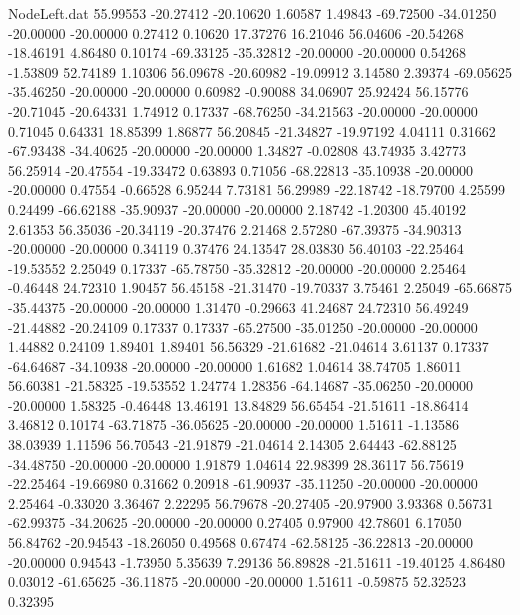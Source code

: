 \begin{filecontents}{NodeLeft.dat}
  55.99553  -20.27412  -20.10620     1.60587    1.49843  -69.72500  -34.01250  -20.00000  -20.00000    0.27412    0.10620   17.37276   16.21046
  56.04606  -20.54268  -18.46191     4.86480    0.10174  -69.33125  -35.32812  -20.00000  -20.00000    0.54268   -1.53809   52.74189    1.10306
  56.09678  -20.60982  -19.09912     3.14580    2.39374  -69.05625  -35.46250  -20.00000  -20.00000    0.60982   -0.90088   34.06907   25.92424
  56.15776  -20.71045  -20.64331     1.74912    0.17337  -68.76250  -34.21563  -20.00000  -20.00000    0.71045    0.64331   18.85399    1.86877
  56.20845  -21.34827  -19.97192     4.04111    0.31662  -67.93438  -34.40625  -20.00000  -20.00000    1.34827   -0.02808   43.74935    3.42773
  56.25914  -20.47554  -19.33472     0.63893    0.71056  -68.22813  -35.10938  -20.00000  -20.00000    0.47554   -0.66528    6.95244    7.73181
  56.29989  -22.18742  -18.79700     4.25599    0.24499  -66.62188  -35.90937  -20.00000  -20.00000    2.18742   -1.20300   45.40192    2.61353
  56.35036  -20.34119  -20.37476     2.21468    2.57280  -67.39375  -34.90313  -20.00000  -20.00000    0.34119    0.37476   24.13547   28.03830
  56.40103  -22.25464  -19.53552     2.25049    0.17337  -65.78750  -35.32812  -20.00000  -20.00000    2.25464   -0.46448   24.72310    1.90457
  56.45158  -21.31470  -19.70337     3.75461    2.25049  -65.66875  -35.44375  -20.00000  -20.00000    1.31470   -0.29663   41.24687   24.72310
  56.49249  -21.44882  -20.24109     0.17337    0.17337  -65.27500  -35.01250  -20.00000  -20.00000    1.44882    0.24109    1.89401    1.89401
  56.56329  -21.61682  -21.04614     3.61137    0.17337  -64.64687  -34.10938  -20.00000  -20.00000    1.61682    1.04614   38.74705    1.86011
  56.60381  -21.58325  -19.53552     1.24774    1.28356  -64.14687  -35.06250  -20.00000  -20.00000    1.58325   -0.46448   13.46191   13.84829
  56.65454  -21.51611  -18.86414     3.46812    0.10174  -63.71875  -36.05625  -20.00000  -20.00000    1.51611   -1.13586   38.03939    1.11596
  56.70543  -21.91879  -21.04614     2.14305    2.64443  -62.88125  -34.48750  -20.00000  -20.00000    1.91879    1.04614   22.98399   28.36117
  56.75619  -22.25464  -19.66980     0.31662    0.20918  -61.90937  -35.11250  -20.00000  -20.00000    2.25464   -0.33020    3.36467    2.22295
  56.79678  -20.27405  -20.97900     3.93368    0.56731  -62.99375  -34.20625  -20.00000  -20.00000    0.27405    0.97900   42.78601    6.17050
  56.84762  -20.94543  -18.26050     0.49568    0.67474  -62.58125  -36.22813  -20.00000  -20.00000    0.94543   -1.73950    5.35639    7.29136
  56.89828  -21.51611  -19.40125     4.86480    0.03012  -61.65625  -36.11875  -20.00000  -20.00000    1.51611   -0.59875   52.32523    0.32395

\end{filecontents}
